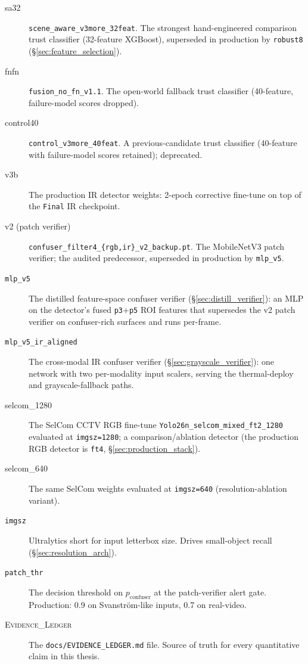 \begin{description}
    \item[sa32] \texttt{scene\_aware\_v3more\_32feat}. The strongest hand-engineered comparison trust classifier (32-feature XGBoost), superseded in production by \texttt{robust8} (\S\ref{sec:feature_selection}).
    \item[fnfn] \texttt{fusion\_no\_fn\_v1.1}. The open-world fallback trust classifier (40-feature, failure-model scores dropped).
    \item[control40] \texttt{control\_v3more\_40feat}. A previous-candidate trust classifier (40-feature with failure-model scores retained); deprecated.
    \item[v3b] The production IR detector weights: 2-epoch corrective fine-tune on top of the \texttt{Final} IR checkpoint.
    \item[v2 (patch verifier)] \texttt{confuser\_filter4\_\{rgb,ir\}\_v2\_backup.pt}. The MobileNetV3 patch verifier; the audited predecessor, superseded in production by \texttt{mlp\_v5}.
    \item[\texttt{mlp\_v5}] The distilled feature-space confuser verifier (\S\ref{sec:distill_verifier}): an MLP on the detector's fused \texttt{p3}+\texttt{p5} ROI features that supersedes the v2 patch verifier on confuser-rich surfaces and runs per-frame.
    \item[\texttt{mlp\_v5\_ir\_aligned}] The cross-modal IR confuser verifier (\S\ref{sec:grayscale_verifier}): one network with two per-modality input scalers, serving the thermal-deploy and grayscale-fallback paths.
    \item[selcom\_1280] The SelCom CCTV RGB fine-tune \texttt{Yolo26n\_selcom\_mixed\_ft2\_1280} evaluated at \texttt{imgsz=1280}; a comparison/ablation detector (the production RGB detector is \texttt{ft4}, \S\ref{sec:production_stack}).
    \item[selcom\_640] The same SelCom weights evaluated at \texttt{imgsz=640} (resolution-ablation variant).
    \item[\texttt{imgsz}] Ultralytics short for input letterbox size. Drives small-object recall (\S\ref{sec:resolution_arch}).
    \item[\texttt{patch\_thr}] The decision threshold on $p_\text{confuser}$ at the patch-verifier alert gate. Production: 0.9 on Svanstr\"om-like inputs, 0.7 on real-video.
    \item[\textsc{Evidence\_Ledger}] The \texttt{docs/EVIDENCE\_LEDGER.md} file. Source of truth for every quantitative claim in this thesis.
\end{description}
